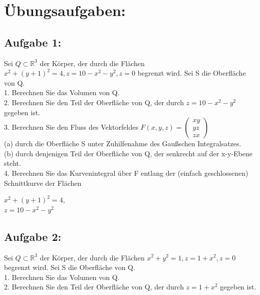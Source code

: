 \documentclass[11pt,final]{scrreprt}
\newcommand{\R} {\mathbb R}
\begin{document}
\newpage
\section{Übungsaufgaben:}
\subsection{Aufgabe 1:}
Sei $Q \subset \R^3$ der Körper, der durch die Flächen $x^2 + (y + 1)^2=4, z=10-x^2-y^2,z=0$ begrenzt wird. Sei S die Oberfläche von Q.\\

1. Berechnen Sie das Volumen von Q.\\

2. Berechnen Sie den Teil der Oberfläche von Q, der durch $z = 10-x^2-y^2$ gegeben ist.\\

3. Berechnen Sie den Fluss des Vektorfeldes $F(x, y, z) =\left(\begin{matrix}
xy\\yz\\zx
\end{matrix}\right)$\\
\hspace*{2em}(a) durch die Oberfläche S unter Zuhilfenahme des Gaußschen Integralsatzes.\\
\hspace*{2em}(b) durch denjenigen Teil der Oberfläche von Q, der senkrecht auf der x-y-Ebene steht.\\

4. Berechnen Sie das Kurvenintegral über F entlang der (einfach geschlossenen) Schnittkurve der Flächen\\
\begin{center}
$x^2 + (y + 1)^2 = 4,$\\
$z = 10-x^2-y^2$
\end{center}

\subsection{Aufgabe 2:}
Sei $Q \subset \R^3$ der Körper, der durch die Flächen $x^2 + y^2=1, z=1+x^2, z=0$ begrenzt wird. Sei S die Oberfläche von Q.\\

1. Berechnen Sie das Volumen von Q.\\

2. Berechnen Sie den Teil der Oberfläche von Q, der durch $z = 1+x^2$ gegeben ist.\\
\end{document}
